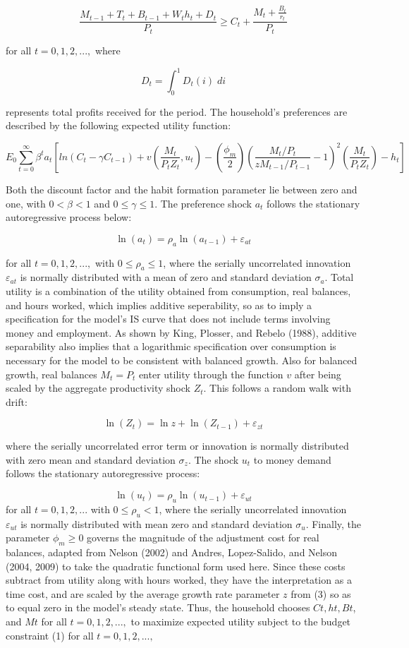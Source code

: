 \documentclass[11pt,preprint, authoryear]{elsarticle}
\numberwithin{equation}{section}
\numberwithin{figure}{section}
\numberwithin{table}{section}
\begin{document}
\[\frac{M_{t-1}+T_{t}+B_{t-1}+W_{t}h_{t}+D_{t}}{P_{t}} \ge C_{t} + \frac{M_{t} + \frac{B_{t}}{r_{t}}}{P_{t}}\]

for all \(t=0,1,2,...,\) where

\[D_{t}= \int_{0}^{1}D_{t}{(i)}\;di\]

represents total profits received for the period. The household's
preferences are described by the following expected utility function:

\[E_{0}\sum_{t=0}^{\infty}\beta^{t}a_{t}[ln(C_{t} - \gamma C_{t-1}) + v(\frac{M_{t}}{P_{t}Z_{t}}, u_t)-(\frac{\phi_m}{2})(\frac{M_t/P_t}{zM_{t-1}/P_{t-1}}-1)^{2}(\frac{M_{t}}{P_{t}Z_{t}})-h_{t}]\]

Both the discount factor and the habit formation parameter lie between
zero and one, with \(0<\beta<1\) and \(0 \le \gamma \le1\). The
preference shock \(a_{t}\) follows the stationary autoregressive process
below:

\[\ln(a_{t})=\rho_{a} \ln(a_{t-1}) + \varepsilon_{at} \tag{2}\]

for all \(t=0,1,2,...,\) with \(0 \le \rho_{a} \le 1\), where the
serially uncorrelated innovation \(\varepsilon_{at}\) is normally
distributed with a mean of zero and standard deviation \(\sigma_{a}\).
Total utility is a combination of the utility obtained from consumption,
real balances, and hours worked, which implies additive seperability, so
as to imply a specification for the model's IS curve that does not
include terms involving money and employment. As shown by King, Plosser,
and Rebelo (1988), additive separability also implies that a logarithmic
specification over consumption is necessary for the model to be
consistent with balanced growth. Also for balanced growth, real balances
\(M_{t}=P_{t}\) enter utility through the function \(v\) after being
scaled by the aggregate productivity shock \(Z_{t}\). This follows a
random walk with drift:

\[\ln(Z_{t})= \ln{z} + \ln(Z_{t-1}) + \varepsilon_{zt} \tag{3}\]

where the serially uncorrelated error term or innovation is normally
distributed with zero mean and standard deviation \(\sigma_{z}\). The
shock \(u_{t}\) to money demand follows the stationary autoregressive
process:

\[\ln(u_{t})= \rho_{u} \ln(u_{t-1}) + \varepsilon_{ut} \tag{4}\] for all
\(t=0,1,2,...\) with \(0 \le \rho_{u} <1\), where the serially
uncorrelated innovation \(\varepsilon_{ut}\) is normally distributed
with mean zero and standard deviation \(\sigma_{u}\). Finally, the
parameter \(\phi_{m} \ge 0\) governs the magnitude of the adjustment
cost for real balances, adapted from Nelson (2002) and Andres,
Lopez-Salido, and Nelson (2004, 2009) to take the quadratic functional
form used here. Since these costs subtract from utility along with hours
worked, they have the interpretation as a time cost, and are scaled by
the average growth rate parameter \(z\) from (3) so as to equal zero in
the model's steady state. Thus, the household chooses \(Ct, ht, Bt\),
and \(Mt\) for all \(t = 0, 1, 2,...,\) to maximize expected utility
subject to the budget constraint (1) for all \(t = 0,1,2,...,\)
\end{document}
